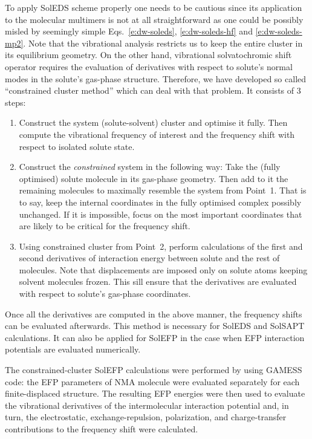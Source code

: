 \documentclass[b5paper,oneside,fleqn,11pt]{book}
\begin{document}
\begin{appendices}
\begin{refsection}
To apply SolEDS scheme properly one needs to be cautious 
since its application to the molecular multimers is not at all
straightforward as one could be possibly misled by seemingly simple
Eqs.~\eqref{e:dw-soleds}, \eqref{e:dw-soleds-hf} and \eqref{e:dw-soleds-mp2}. 
Note that the vibrational analysis restricts us to keep the entire cluster
in its equilibrium geometry. On the other hand, vibrational
solvatochromic shift operator requires the evaluation of derivatives
with respect to solute's normal modes in the solute's gas\hyp{}phase
structure. Therefore, we have developed so called ``constrained cluster method''
which can deal with that problem. It consists of 3 steps:
%
\begin{enumerate}
 \item Construct the system (solute\hyp{}solvent) cluster and
       optimise it fully. Then compute the vibrational frequency
       of interest and the frequency shift with respect to isolated
       solute state.
 \item Construct the \emph{constrained} system in the following way:
       Take the (fully optimised) solute molecule in its gas\hyp{}phase
       geometry. Then add to it the remaining molecules to maximally resemble
       the system from Point~1. That is to say, keep the internal coordinates
       in the fully optimised complex possibly unchanged. If it is impossible,
       focus on the most important coordinates that are likely to be critical
       for the frequency shift.
 \item Using constrained cluster from Point~2, perform calculations 
       of the first and second derivatives of interaction energy between
       solute and the rest of molecules. Note that displacements
       are imposed only on solute atoms keeping solvent
       molecules frozen. This sill ensure that the derivatives are evaluated
       with respect to solute's gas\hyp{}phase coordinates.
\end{enumerate}
%
Once all the derivatives are computed in the above manner, the frequency shifts
can be evaluated afterwards. This method is necessary for SolEDS
and SolSAPT calculations. It can also be applied for SolEFP
in the case when EFP interaction potentials are evaluated numerically.

The constrained\hyp{}cluster SolEFP calculations
were performed by using GAMESS code: the EFP parameters
of NMA molecule were evaluated separately for
each finite\hyp{}displaced structure. The resulting EFP energies were then used
to evaluate the vibrational derivatives of the intermolecular
interaction potential and, in turn, the electrostatic, exchange\hyp{}repulsion,
polarization, and charge\hyp{}transfer contributions to
the frequency shift were calculated.


\end{refsection}
\end{appendices}
\end{document}

